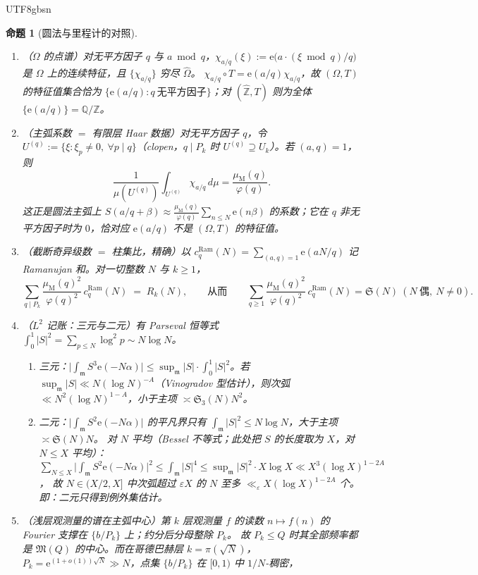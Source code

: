 \documentclass[11pt,a4paper]{article}
\newcommand{\Zhat}{\widehat{\mathbb Z}}
\newcommand{\Haar}{\mu}
\newcommand{\Sing}{\mathfrak S}
\newcommand{\Om}{\Omega}               %
\newcommand{\Mob}{\mu_{\mathrm{M}}}    %
\newcommand{\ee}{\mathrm e}
\newcommand{\Ram}{c^{\mathrm{Ram}}}    %
\newcommand{\Maj}{\mathfrak M}
\newcommand{\Min}{\mathfrak m}
\theoremstyle{plain}
\newtheorem{prop}{命题}
\theoremstyle{definition}
\begin{document}
\begin{CJK}{UTF8}{gbsn}
\begin{prop}[圆法与里程计的对照]\label{g4:prop:circle}
\begin{enumerate}[label=(\alph*)]
\item（$\Om$ 的点谱）对无平方因子 $q$ 与 $a\bmod q$，$\chi_{a/q}(\xi):=\ee\bigl(a\cdot(\xi\bmod q)/q\bigr)$ 是 $\Om$ 上的连续特征，且 $\{\chi_{a/q}\}$ 穷尽 $\widehat\Om$。
$\chi_{a/q}\circ T=\ee(a/q)\chi_{a/q}$，故 $(\Om,T)$ 的特征值集合恰为 $\{\ee(a/q):q\ \text{无平方因子}\}$；对 $(\Zhat,T)$ 则为全体 $\{\ee(a/q)\}=\mathbb Q/\mathbb Z$。
\item（主弧系数 $=$ 有限层 Haar 数据）对无平方因子 $q$，令 $U^{(q)}:=\{\xi:\xi_p\ne0,\ \forall p\mid q\}$（clopen，$q\mid P_k$ 时 $U^{(q)}\supseteq U_k$）。若 $(a,q)=1$，则
\[
\frac1{\Haar(U^{(q)})}\int_{U^{(q)}}\chi_{a/q}\,d\Haar=\frac{\Mob(q)}{\varphi(q)} .
\]
这正是圆法主弧上 $S(a/q+\beta)\approx\frac{\Mob(q)}{\varphi(q)}\sum_{n\le N}\ee(n\beta)$ 的系数；它在 $q$ 非无平方因子时为 $0$，恰对应 $\ee(a/q)$ 不是 $(\Om,T)$ 的特征值。
\item（截断奇异级数 $=$ 柱集比，精确）以 $\Ram_q(N)=\sum_{(a,q)=1}\ee(aN/q)$ 记 Ramanujan 和。对一切整数 $N$ 与 $k\ge1$，
\[
\sum_{q\mid P_k}\frac{\Mob(q)^2}{\varphi(q)^2}\,\Ram_q(N)\;=\;R_k(N),
\qquad\text{从而}\qquad
\sum_{q\ge1}\frac{\Mob(q)^2}{\varphi(q)^2}\,\Ram_q(N)=\Sing(N)\ (N\ \text{偶},\ N\neq0).
\]
\item（$L^2$ 记账：三元与二元）有 Parseval 恒等式 $\int_0^1|S|^2=\sum_{p\le N}\log^2p\sim N\log N$。
\begin{enumerate}[label=(\roman*)]
\item 三元：$\bigl|\int_{\Min}S^3\ee(-N\alpha)\bigr|\le\sup_{\Min}|S|\cdot\int_0^1|S|^2$。若 $\sup_{\Min}|S|\ll N(\log N)^{-A}$（Vinogradov 型估计），则次弧 $\ll N^2(\log N)^{1-A}$，小于主项 $\asymp\Sing_3(N)N^2$。
\item 二元：$\bigl|\int_{\Min}S^2\ee(-N\alpha)\bigr|$ 的平凡界只有 $\int_{\Min}|S|^2\le N\log N$，\emph{大于}主项 $\asymp\Sing(N)N$。
对 $N$ 平均（Bessel 不等式；此处把 $S$ 的长度取为 $X$，对 $N\le X$ 平均）：$\sum_{N\le X}\bigl|\int_{\Min}S^2\ee(-N\alpha)\bigr|^2\le\int_{\Min}|S|^4\le\sup_{\Min}|S|^2\cdot X\log X\ll X^3(\log X)^{1-2A}$，
故 $N\in(X/2,X]$ 中次弧超过 $\varepsilon X$ 的 $N$ 至多 $\ll_\varepsilon X(\log X)^{1-2A}$ 个。即：二元只得到例外集估计。
\end{enumerate}
\item（浅层观测量的谱在主弧中心）第 $k$ 层观测量 $f$ 的读数 $n\mapsto f(n)$ 的 Fourier 支撑在 $\{b/P_k\}$ 上；约分后分母整除 $P_k$。
故 $P_k\le Q$ 时其全部频率都是 $\Maj(Q)$ 的中心。而在哥德巴赫层 $k=\pi(\sqrt N)$，$P_k=\ee^{(1+o(1))\sqrt N}\gg N$，点集 $\{b/P_k\}$ 在 $[0,1)$ 中 $1/N$-稠密，

\end{enumerate}
\end{prop}
\end{CJK}
\end{document}

